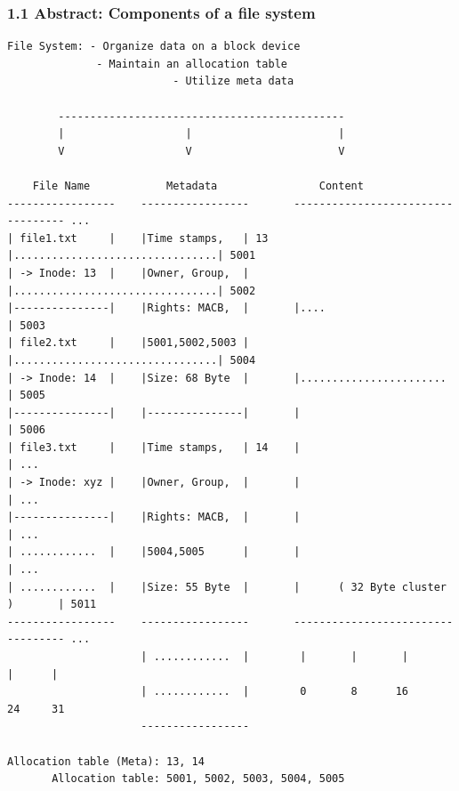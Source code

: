 \begin{frame}[fragile]
  \frametitle{1.1 Abstract: Components of a file system}
  \begin{lstlisting}[basicstyle=\tiny\ttfamily]
             File System: - Organize data on a block device
			  - Maintain an allocation table
                          - Utilize meta data
                            
        ---------------------------------------------
        |                   |                       |
        V                   V                       V

    File Name            Metadata                Content     
-----------------    -----------------       ---------------------------------- ...
| file1.txt     |    |Time stamps,   | 13    |................................| 5001
| -> Inode: 13  |    |Owner, Group,  |       |................................| 5002
|---------------|    |Rights: MACB,  |       |....                            | 5003
| file2.txt     |    |5001,5002,5003 |       |................................| 5004
| -> Inode: 14  |    |Size: 68 Byte  |       |.......................         | 5005
|---------------|    |---------------|       |                                | 5006
| file3.txt     |    |Time stamps,   | 14    |                                | ...
| -> Inode: xyz |    |Owner, Group,  |       |                                | ...
|---------------|    |Rights: MACB,  |       |                                | ...
| ............  |    |5004,5005      |       |                                | ...
| ............  |    |Size: 55 Byte  |       |      ( 32 Byte cluster )       | 5011
-----------------    -----------------       ---------------------------------- ...
                     | ............  |        |       |       |       |      |
                     | ............  |        0       8      16      24     31
                     -----------------    

Allocation table (Meta): 13, 14
       Allocation table: 5001, 5002, 5003, 5004, 5005
  \end{lstlisting}
\end{frame}


